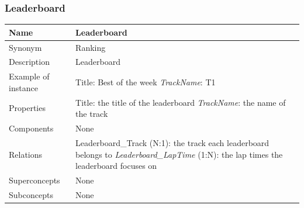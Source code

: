 \documentclass{beamer}
\begin{document}
\begin{frame}
\frametitle{Leaderboard}
\begin{table}
\tiny
\begin{tabular}{|p{2cm}|p{6cm}|}
\hline
Name & \textbf{Leaderboard} \\
\hline
Synonym & Ranking \\
\hline
Description & Leaderboard \\
\hline
Example of instance &
Title: Best of the week \newline
\textit{TrackName}: T1 \\
\hline
Properties &
Title: the title of the leaderboard \newline
\textit{TrackName}: the name of the track \\
\hline
Components & None \\
\hline
Relations &
Leaderboard\_Track (N:1): the track each leaderboard belongs to \newline
\textit{Leaderboard\_LapTime} (1:N): the lap times the leaderboard focuses on \\
\hline
Superconcepts & None \\
\hline
Subconcepts & None \\
\hline
\end{tabular}
\end{table}
\end{frame}
\end{document}
